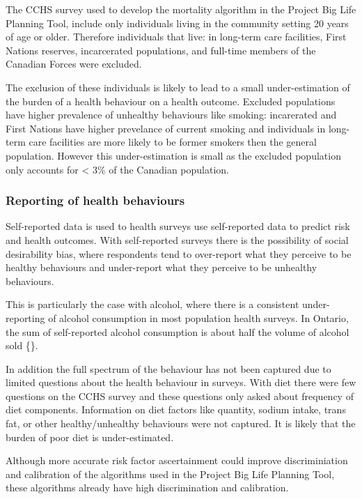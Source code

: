 \documentclass[]{book}
\begin{document}
The CCHS survey used to develop the mortality algorithm in the Project Big Life Planning Tool, include only individuals living in the community setting 20 years of age or older. Therefore individuals that live: in long-term care facilities, First Nations reserves, incarcerated populations, and full-time members of the Canadian Forces were excluded.

The exclusion of these individuals is likely to lead to a small under-estimation of the burden of a health behaviour on a health outcome. Excluded populations have higher prevalence of unhealthy behaviours like smoking: incarerated and First Nations have higher prevelance of current smoking and individuals in long-term care facilities are more likely to be former smokers then the general population. However this under-estimation is small as the excluded population only accounts for \textless{} 3\% of the Canadian population.

\hypertarget{reporting-of-health-behaviours}{%
\subsubsection{Reporting of health behaviours}\label{reporting-of-health-behaviours}}

Self-reported data is used to health surveys use self-reported data to predict risk and health outcomes. With self-reported surveys there is the possibility of social desirability bias, where respondents tend to over-report what they perceive to be healthy behaviours and under-report what they perceive to be unhealthy behaviours.

This is particularly the case with alcohol, where there is a consistent under-reporting of alcohol consumption in most population health surveys. In Ontario, the sum of self-reported alcohol consumption is about half the volume of alcohol sold \{\citet{ONalcohol}\}.

In addition the full spectrum of the behaviour has not been captured due to limited questions about the health behaviour in surveys. With diet there were few questions on the CCHS survey and these questions only asked about frequency of diet components. Information on diet factors like quantity, sodium intake, trans fat, or other healthy/unhealthy behaviours were not captured. It is likely that the burden of poor diet is under-estimated.

Although more accurate risk factor ascertainment could improve discriminiation and calibration of the algorithms used in the Project Big Life Planning Tool, these algorithms already have high discrimination and calibration.
\end{document}
